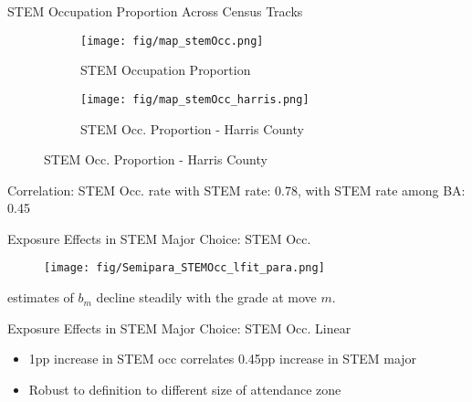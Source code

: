 \documentclass[aspectratio=169,xcolor=dvipsnames]{beamer}
\begin{document}
\begin{frame}{STEM Occupation Proportion Across Census Tracks}\label{map_stemOcc}
    \begin{figure}[H]
    \centering
	\begin{subfigure}[t]{0.43\textwidth}
        \centering
    		\caption{STEM Occupation Proportion}
    		\texttt{[image: fig/map\_stemOcc.png]}
	\end{subfigure}%
	\begin{subfigure}[t]{0.45\textwidth}
	    \centering
    		\caption{STEM Occ. Proportion - Harris County}
    		\texttt{[image: fig/map\_stemOcc\_harris.png]}
	\end{subfigure}
	\par\smallskip
    \end{figure}
Correlation: STEM Occ. rate with STEM rate: 0.78, with STEM rate among BA: 0.45 \hyperlink{map_stem_stemOcc}{}
\end{frame}

\begin{frame}{Exposure Effects in STEM Major Choice: STEM Occ.}


\begin{figure}[H]
    \centering
    \texttt{[image: fig/Semipara\_STEMOcc\_lfit\_para.png]}
    \par\smallskip
\end{figure}
estimates of $b_m$ decline steadily with the grade at move $m$.
\end{frame}

\begin{frame}{Exposure Effects in STEM Major Choice: STEM Occ. Linear}\label{tab_STEMOcc}
    \begin{table}[!htbp]
	\centering \footnotesize
	\captionsetup{width=1.0\textwidth}
\end{table}
\begin{itemize}
    \item 1pp increase in STEM occ correlates 0.45pp increase in STEM major \hyperlink{STEM_major_occ}{}
    \item Robust to definition to different size of attendance zone \hyperlink{tab_STEMOcc_robust}{}
\end{itemize}
\end{frame}
\end{document}
